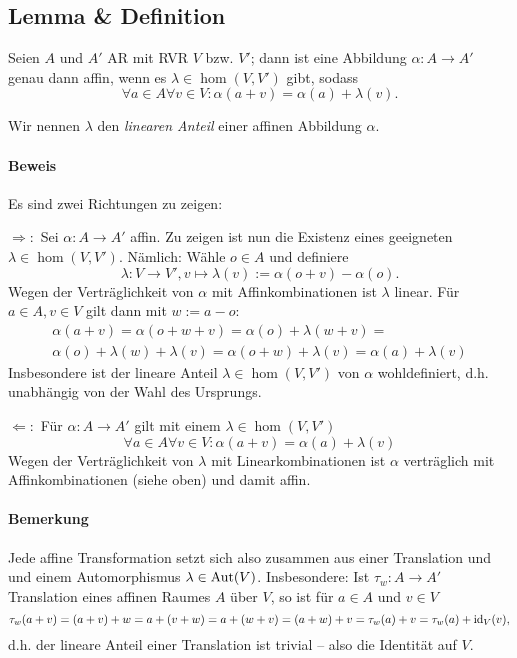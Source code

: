  \subsection{Lemma \& Definition}
 	\begin{Lemma}
 		Seien $ A $ und $ A' $ AR mit RVR $ V $ bzw. $ V' $; dann ist eine Abbildung $ \alpha:A\to A' $ genau dann affin, wenn es $ \lambda\in\hom(V,V') $ gibt, sodass
 		\[
 			\forall a\in A\forall v\in V:\alpha(a+v)=\alpha(a)+\lambda(v).
 		\]
 	\end{Lemma}
 	\begin{Definition}
 		Wir nennen $ \lambda $ den \emph{linearen Anteil} einer affinen Abbildung $ \alpha $.
 	\end{Definition}
 	\paragraph{Beweis}
 		Es sind zwei Richtungen zu zeigen:

 		$ \Rightarrow: $ Sei $ \alpha:A\to A' $ affin. Zu zeigen ist nun die Existenz eines geeigneten $ \lambda \in\hom(V,V') $. Nämlich: Wähle $ o\in A $ und definiere
 		\[
 			\lambda:V\to V',v\mapsto \lambda(v):=\alpha(o+v)-\alpha(o).
 		\]
 		Wegen der Verträglichkeit von $ \alpha $ mit Affinkombinationen ist $ \lambda $ linear. Für $ a\in A,v\in V $ gilt dann mit $ w:=a-o $:
 		\begin{gather*}
 			\alpha(a+v) = \alpha(o+w+v) = \alpha(o)+\lambda(w+v) =\\ \alpha(o)+\lambda(w)+\lambda(v) = \alpha(o+w)+\lambda(v) = \alpha(a)+\lambda(v)
 		\end{gather*}
 		Insbesondere ist der lineare Anteil $ \lambda \in\hom(V,V')$ von $ \alpha $ wohldefiniert, d.h. unabhängig von der Wahl des Ursprungs.

 		$ \Leftarrow: $ Für $ \alpha:A\to A' $ gilt mit einem $ \lambda\in\hom(V,V') $
 		\[
 			\forall a\in A\forall v\in V:\alpha(a+v)=\alpha(a)+\lambda(v)
 		\]
 		Wegen der Verträglichkeit von $ \lambda $ mit Linearkombinationen ist $ \alpha $ verträglich mit Affinkombinationen (siehe oben) und damit affin.
 	\paragraph{Bemerkung}
 		Jede affine Transformation setzt sich also zusammen aus einer Translation und und einem Automorphismus $ \lambda \in \operatorname{Aut}(V) $. Insbesondere: Ist $ \tau_w:A\to A' $ Translation eines affinen Raumes $ A $ über $ V $, so ist für $ a\in A $ und $ v\in V $
 		\[
 			\tau_w(a+v) = (a+v)+w = a+(v+w) = a+(w+v) = (a+w)+v = \tau_w(a)+v = \tau_w(a)+\operatorname{id}_V(v),
 		\]
 		d.h. der lineare Anteil einer Translation ist trivial -- also die Identität auf $ V $.
